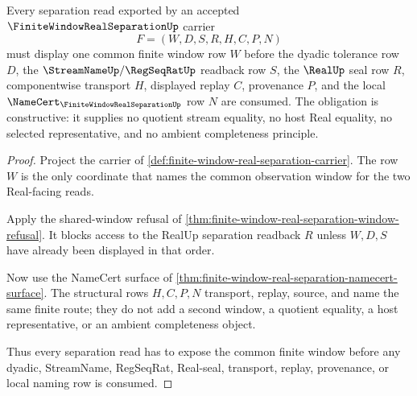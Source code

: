 \begin{theorem}
\label{thm:finite-window-real-separation-shared-window-obligation}
Every separation read exported by an accepted $\FiniteWindowRealSeparationUp$ carrier
$$
F=(W,D,S,R,H,C,P,N)
$$
must display one common finite window row $W$ before the dyadic tolerance row $D$, the $\StreamNameUp/\RegSeqRatUp$ readback row $S$, the $\RealUp$ seal row $R$, componentwise transport $H$, displayed replay $C$, provenance $P$, and the local $\NameCert_{\FiniteWindowRealSeparationUp}$ row $N$ are consumed. The obligation is constructive: it supplies no quotient stream equality, no host Real equality, no selected representative, and no ambient completeness principle.
\end{theorem}
\begin{proof}
Project the carrier of \autoref{def:finite-window-real-separation-carrier}. The row $W$ is the only coordinate that names the common observation window for the two Real-facing reads.

Apply the shared-window refusal of \autoref{thm:finite-window-real-separation-window-refusal}. It blocks access to the RealUp separation readback $R$ unless $W,D,S$ have already been displayed in that order.

Now use the NameCert surface of \autoref{thm:finite-window-real-separation-namecert-surface}. The structural rows $H,C,P,N$ transport, replay, source, and name the same finite route; they do not add a second window, a quotient equality, a host representative, or an ambient completeness object.

Thus every separation read has to expose the common finite window before any dyadic, StreamName, RegSeqRat, Real-seal, transport, replay, provenance, or local naming row is consumed.
\end{proof}

